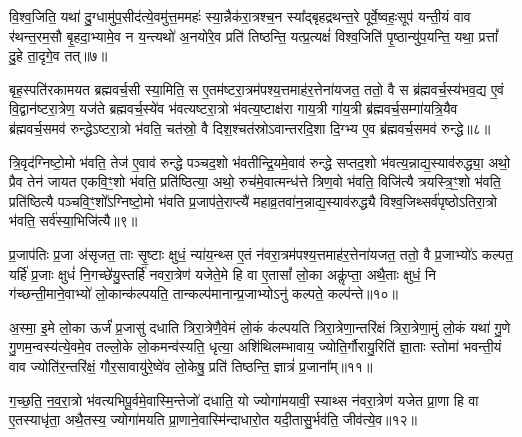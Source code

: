 वि॒श्व॒जिति॒ यथा॑ दु॒ग्धामु॑प॒सीद॑त्ये॒वमु॑त्त॒ममहः॑ स्या॒न्नैक॑रा॒त्रश्च॒न स्या᳚द्बृहद्रथन्त॒रे पूर्वे॒ष्वहः॒सूप॑ यन्ती॒यं वाव र॑थन्त॒रम॒सौ बृ॒हदा॒भ्यामे॒व न य॒न्त्यथो॑ अ॒नयो॑रे॒व प्रति॑ तिष्ठन्ति॒ यत्प्र॒त्यक्षं॑ विश्व॒जिति॑ पृ॒ष्ठान्यु॑प॒यन्ति॒ यथा॒ प्रत्तां᳚ दु॒हे ता॒दृगे॒व तत्॥७॥

{\anuvakamend[{तेज॑ उपे॒युः प्र॒त्यक्षं॒ द्विच॑त्वारिꣳशच्च॥२॥}]}

बृह॒स्पति॑रकामयत ब्रह्मवर्च॒सी स्या॒मिति॒ स ए॒तम॑ष्टरा॒त्रम॑पश्य॒त्तमाह॑र॒त्तेना॑यजत॒ ततो॒ वै स ब्र॑ह्मवर्च॒स्य॑भव॒द्य ए॒वं वि॒द्वान॑ष्टरा॒त्रेण॒ यज॑ते ब्रह्मवर्च॒स्ये॑व भ॑वत्यष्टरा॒त्रो भ॑वत्य॒ष्टाक्ष॑रा गाय॒त्री गा॑य॒त्री ब्र॑ह्मवर्च॒सम्गा॑यत्रि॒यैव ब्र॑ह्मवर्च॒समव॑ रुन्द्धे\-ऽष्टरा॒त्रो भ॑वति॒ चत॑स्रो॒ वै दिश॒श्चत॑स्रो\-ऽवान्तरदि॒शा दि॒ग्भ्य ए॒व ब्र॑ह्मवर्च॒समव॑ रुन्द्धे॥८॥

त्रि॒वृद॑ग्निष्टो॒मो भ॑वति॒ तेज॑ ए॒वाव॑ रुन्द्धे पञ्चद॒शो भ॑वतीन्द्रि॒यमे॒वाव॑ रुन्द्धे सप्तद॒शो भ॑वत्य॒न्नाद्य॒स्याव॑रुद्ध्या॒ अथो॒ प्रैव तेन॑ जायत एकवि॒ꣳ॒शो भ॑वति॒ प्रति॑ष्ठित्या॒ अथो॒ रुच॑मे॒वात्मन्ध॑त्ते त्रिण॒वो भ॑वति॒ विजि॑त्यै त्रयस्त्रि॒ꣳ॒शो भ॑वति॒ प्रति॑ष्ठित्यै पञ्चवि॒ꣳ॒शो᳚\-ऽग्निष्टो॒मो भ॑वति प्र॒जाप॑ते॒राप्त्यै॑ महाव्र॒तवा॑न॒न्नाद्य॒स्याव॑रुद्ध्यै विश्व॒जिथ्सर्व॑पृष्ठो\-ऽतिरा॒त्रो भ॑वति॒ सर्व॑स्या॒भिजि॑त्यै॥९॥

{}

प्र॒जाप॑तिः प्र॒जा अ॑सृजत॒ ताः सृ॒ष्टाः क्षुधं॒ न्या॑य॒न्थ्स ए॒तं न॑वरा॒त्रम॑पश्य॒त्तमाह॑र॒त्तेना॑यजत॒ ततो॒ वै प्र॒जाभ्यो॑\-ऽ कल्पत॒ यर्\mbox{}हि॑ प्र॒जाः क्षुधं॑ नि॒गच्छे॑यु॒स्तर्\mbox{}हि॑ नवरा॒त्रेण॑ यजेते॒मे हि वा ए॒तासां᳚ लो॒का अकॢ॑प्ता॒ अथै॒ताः क्षुधं॒ नि ग॑च्छन्ती॒माने॒वाभ्यो॑ लो॒कान्क॑ल्पयति॒ तान्कल्प॑मानान्प्र॒जाभ्यो\-ऽनु॑ कल्पते॒ कल्प॑न्ते॥१०॥

अ॒स्मा॒ इ॒मे लो॒का ऊर्जं॑ प्र॒जासु॑ दधाति त्रिरा॒त्रेणै॒वेमं लो॒कं क॑ल्पयति त्रिरा॒त्रेणा॒न्तरि॑क्षं त्रिरा॒त्रेणा॒मुं लो॒कं यथा॑ गु॒णे गु॒णम॒न्वस्य॑त्ये॒वमे॒व तल्लो॒के लो॒कमन्व॑स्यति॒ धृत्या॒ अशि॑थिलम्भावाय॒ ज्योति॒र्गौरायु॒रिति॑ ज्ञा॒ताः स्तोमा॑ भवन्ती॒यं वाव ज्योति॑र॒न्तरि॑क्षं॒ गौर॒सावायु॑रे॒ष्वे॑व लो॒केषु॒ प्रति॑ तिष्ठन्ति॒ ज्ञात्रं॑ प्र॒जाना᳚म्॥११॥

ग॒च्छ॒ति॒ न॒व॒रा॒त्रो भ॑वत्यभिपू॒र्वमे॒वास्मि॒न्तेजो॑ दधाति॒ यो ज्योगा॑मयावी॒ स्याथ्स न॑वरा॒त्रेण॑ यजेत प्रा॒णा हि वा ए॒तस्याधृ॑ता॒ अथै॒तस्य॒ ज्योगा॑मयति प्रा॒णाने॒वास्मि॑न्दाधारो॒त यदी॒तासु॒र्भव॑ति॒ जीव॑त्ये॒व॥१२॥

{\anuvakamend[{कल्प॑न्ते प्र॒जाना॒न्त्रय॑स्त्रिꣳशच्च॥४॥}]}

